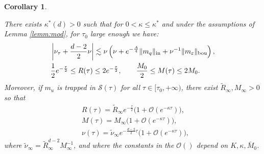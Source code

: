 \documentclass[11pt]{aims}
\newtheorem{corollary}[theorem]{Corollary}
\theoremstyle{definition}
\newcommand{\Sc}{\mathcal{S}}
\newcommand{\Oc}{\mathcal{O}}
\newcommand{\inn}{\textup{in}}
\newcommand{\bd}{\textup{bou}}
\numberwithin{equation}{section}
\begin{document}
\begin{corollary} \label{cor:mod}

There exists $\kappa^*(d)>0$ such that for $0<\kappa\leq \kappa^*$ and under the assumptions of Lemma \ref{lemm:mod}, for $\tau_0$ large enough we have:
\begin{align}\label{eq:Modnu}
& \left| \nu_\tau+\frac{d-2}{2}\nu \right|\lesssim \nu \left( \nu+e^{-\frac A4}\| m_q\|_{\inn}+\nu^{-1} \| m_\varepsilon \|_{\bd}  \right),\\
\label{bootstrap:improvedRM}
& \frac{1}{2} e^{-\frac{\tau}{2}}\leq R(\tau) \leq 2e^{-\frac{\tau}{2}}, \qquad \frac{M_0}{2}\leq M(\tau) \leq 2M_0 .
\end{align}
Moreover, if $m_u$ is trapped in $\Sc(\tau)$ for all $\tau \in [\tau_0, +\infty)$, there exist $\tilde R_\infty,M_\infty>0$ so that
\begin{align}
\label{modulation:bd:asymptoticR} & R(\tau)=\tilde R_\infty e^{-\frac \tau 2}\big(1+\Oc(e^{-\kappa \tau})\big), \\
\label{modulation:bd:asymptoticM} & M(\tau)=M_\infty \big(1+\Oc(e^{-\kappa \tau})\big),\\
\label{modulation:bd:asymptoticnu} & \nu(\tau)=\tilde \nu_\infty e^{-\frac{d-2}{2} \tau }\big(1+\Oc(e^{-\kappa \tau})\big),
\end{align}
where $\tilde \nu_\infty=\tilde R_{\infty}^{d-2}M_\infty^{-1}$, and where the constants in the $\Oc()$ depend on $K,\kappa,\bar M_0$.

\end{corollary}
\end{document}

